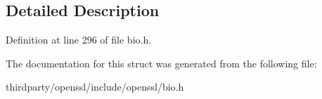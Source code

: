 \subsection{Detailed Description}


Definition at line 296 of file bio.\+h.



The documentation for this struct was generated from the following file\+:\begin{DoxyCompactItemize}
\item 
thirdparty/openssl/include/openssl/bio.\+h\end{DoxyCompactItemize}
